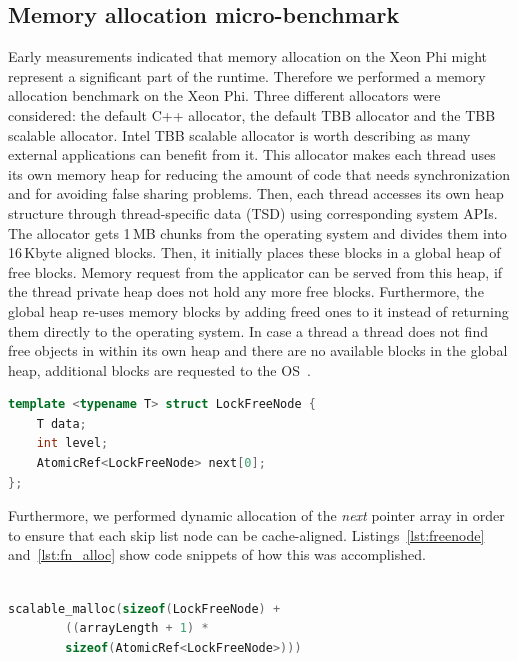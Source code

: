 \subsection{Memory allocation micro-benchmark}
Early measurements indicated that memory allocation on the Xeon Phi might represent a significant part of the runtime. Therefore we performed a memory allocation benchmark on the Xeon Phi. Three different allocators were considered: the default C++ allocator, the default TBB allocator and the TBB scalable allocator. 
Intel TBB scalable allocator is worth describing as many external applications can benefit from it. This allocator makes each thread uses its own memory heap for reducing the amount of code that needs synchronization and for avoiding false sharing problems. Then, each thread accesses its own heap structure through thread-specific data (TSD) using corresponding system APIs. The allocator gets 1\,MB chunks from the operating system and divides them into 16\,Kbyte aligned blocks. Then, it initially places these blocks in a global heap of free blocks. Memory request from the applicator can be served from this heap, if the thread private heap does not hold any more free blocks. Furthermore, the global heap re-uses memory blocks by adding freed ones to it instead of returning them directly to the operating system. In case a thread a thread does not find free objects in within its own heap and there are no available blocks in the global heap, additional blocks are requested to the OS~\cite{_thefoundations,Hudson:2006:MST:1133956.1133967}.  %


\begin{lstlisting}[language=C++,basicstyle=\tt\scriptsize,captionpos=b,caption=Lock free node structure,label=lst:freenode,morekeywords={*, size_t},aboveskip={0.7\baselineskip},belowskip={0.3\baselineskip}]
template <typename T> struct LockFreeNode {
	T data;
	int	level;
	AtomicRef<LockFreeNode>	next[0];
};
\end{lstlisting}

Furthermore, we performed dynamic allocation of the {\em next} pointer array in order to ensure that each skip list node can be cache-aligned. Listings~\ref{lst:freenode} and~\ref{lst:fn_alloc} show code snippets of how this was accomplished.
\begin{lstlisting}[language=C++,basicstyle=\tt\scriptsize,captionpos=b,caption=Memory allocation instruction for array of atomic references,label=lst:fn_alloc, morekeywords={*, size_t},aboveskip={0.3\baselineskip},belowskip={0.3\baselineskip}]

scalable_malloc(sizeof(LockFreeNode) + 
		((arrayLength + 1) * 
		sizeof(AtomicRef<LockFreeNode>)))
\end{lstlisting}

